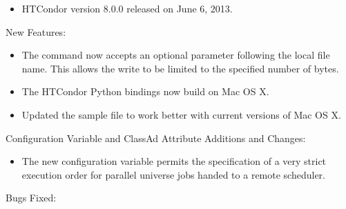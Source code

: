 \begin{itemize}

\item HTCondor version 8.0.0 released on June 6, 2013.

\end{itemize}


\noindent New Features:

\begin{itemize}

\item The   command now accepts an 
optional  parameter following the local file name.
This allows the write to be limited to the specified number of bytes.

\item The HTCondor Python bindings now build on Mac OS X.

\item Updated the sample  file to work better with
current versions of Mac OS X.

\end{itemize}

\noindent Configuration Variable and ClassAd Attribute Additions and Changes:

\begin{itemize}

\item The new configuration variable
permits the specification of a very strict execution order for 
parallel universe jobs handed to a remote scheduler.

\end{itemize}

\noindent Bugs Fixed:

